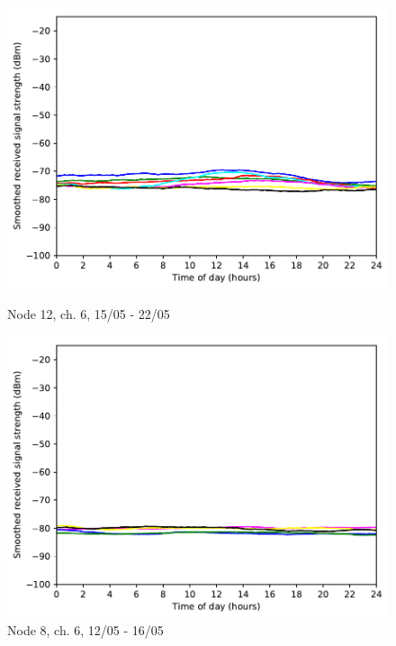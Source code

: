 \documentclass[a4paper, 11pt]{article}
\begin{document}
\begin{figure}
\begin{minipage}{0.47\textwidth}
    \centering
	\includegraphics[width=\textwidth]{images/2_4_GHz/cot-node12-student_2017-05-22_chan6_image}
    \caption{Node 12, ch. 6, 15/05 - 22/05} \label{node12-6}
\end{minipage}\hfill
\begin{minipage}{0.47\textwidth}
    \centering
	\includegraphics[width=\textwidth]{images/2_4_GHz/cot-node8-student_2017-05-16_chan6_image}
    \caption{Node 8, ch. 6, 12/05 - 16/05} \label{node8-6}
\end{minipage}\hfill
\begin{minipage}{0.47\textwidth}
    \centering

\end{minipage}
\end{figure}
\end{document}

